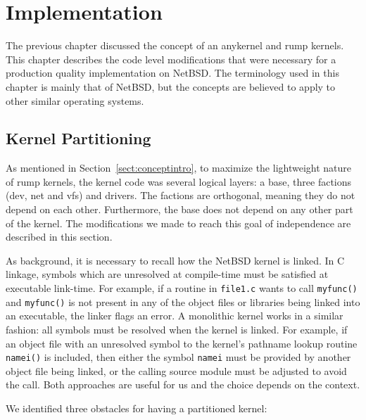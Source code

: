 
\section{Implementation}
\label{chap:implementation}

The previous chapter discussed the concept of an anykernel and rump
kernels.  This chapter describes the code level modifications that
were necessary for a production quality implementation on NetBSD.
The terminology used in this chapter is mainly that of NetBSD, but the
concepts are believed to apply to other similar operating systems.

\subsection{Kernel Partitioning}
\label{sect:partition}

As mentioned in Section~\ref{sect:conceptintro}, to maximize the
lightweight nature of rump kernels, the kernel code was several
logical layers: a base, three factions (dev, net and vfs) and drivers.
The factions are orthogonal, meaning they do not depend on each other.
Furthermore, the base does not depend on any other part of the kernel.
The modifications we made to reach this goal of independence are described
in this section.

As background, it is necessary to recall how the NetBSD kernel is linked.
In C linkage, symbols which are unresolved at compile-time must be
satisfied at executable link-time.  For example, if a routine in
\texttt{file1.c} wants to call \texttt{myfunc()} and \texttt{myfunc()}
is not present in any of the object files or libraries being linked
into an executable, the linker flags an error.  A monolithic kernel
works in a similar fashion:  all symbols must be resolved when the
kernel is linked.  For example, if an object file with an unresolved
symbol to the kernel's pathname lookup routine \texttt{namei()} is
included, then either the symbol \verb+namei+ must be provided by
another object file being linked, or the calling source module must
be adjusted to avoid the call.  Both approaches are useful for us
and the choice depends on the context.

We identified three obstacles for having a partitioned kernel:

